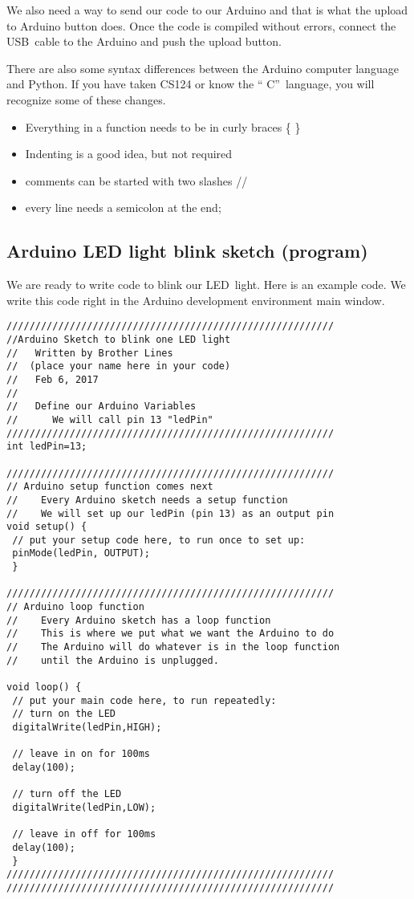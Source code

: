 We also need a way to send our code to our Arduino and that is what the
upload to Arduino button does. Once the code is compiled without errors,
connect the USB\ cable to the Arduino and push the upload button.

There are also some syntax differences between the Arduino computer language
and Python. If you have taken CS124 or know the \textquotedblleft
C\textquotedblright\ language, you will recognize some of these changes.

\begin{itemize}
\item Everything in a function needs to be in curly braces \{ \}

\item Indenting is a good idea, but not required

\item comments can be started with two slashes //

\item every line needs a semicolon at the end;
\end{itemize}

\subsection{Arduino LED light blink sketch (program)}

We are ready to write code to blink our LED\ light. Here is an example code.
We write this code right in the Arduino development environment main window.
\begin{lstlisting}[language=Arduino]
/////////////////////////////////////////////////////////
//Arduino Sketch to blink one LED light
//   Written by Brother Lines
//	(place your name here in your code)
//   Feb 6, 2017
//
//   Define our Arduino Variables
//      We will call pin 13 "ledPin"
/////////////////////////////////////////////////////////
int ledPin=13;
 
/////////////////////////////////////////////////////////
// Arduino setup function comes next
//    Every Arduino sketch needs a setup function
//    We will set up our ledPin (pin 13) as an output pin
void setup() {
 // put your setup code here, to run once to set up:
 pinMode(ledPin, OUTPUT);
 }
 
/////////////////////////////////////////////////////////
// Arduino loop function
//    Every Arduino sketch has a loop function
//    This is where we put what we want the Arduino to do
//    The Arduino will do whatever is in the loop function 
//    until the Arduino is unplugged.
 
void loop() {
 // put your main code here, to run repeatedly:
 // turn on the LED
 digitalWrite(ledPin,HIGH);
 
 // leave in on for 100ms
 delay(100);
 
 // turn off the LED
 digitalWrite(ledPin,LOW);
 
 // leave in off for 100ms
 delay(100);
 }
/////////////////////////////////////////////////////////
/////////////////////////////////////////////////////////
\end{lstlisting}

